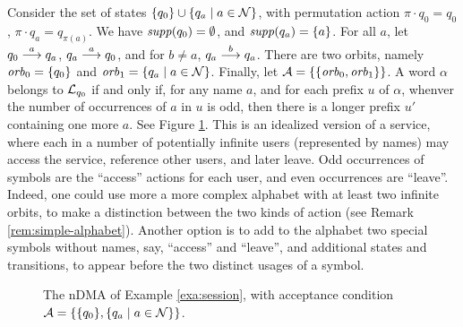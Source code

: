 \begin{example}\label{exa:session}
 Consider the set of states $\{q_0\} \cup \{q_a \mid a \in \mathcal{N}\}$, with permutation action $\pi \cdot q_0 = q_0$, $\pi \cdot q_a = q_{\pi(a)}$. We have $\mathit{supp}(q_0) = \emptyset$, and $\mathit{supp}(q_a) = \{ a \}$. For all $a$, let $q_0 \overset{a}{\longrightarrow} q_a$, $q_a \overset{a}{\longrightarrow} q_0$, and for $b \neq a$, $q_a \overset{b}{\longrightarrow} q_a$. There are two orbits, namely $\mathit{orb}_0 = \{ q_0 \}$ and $\mathit{orb}_1 = \{ q_a \mid a \in \mathcal{N} \} $. Finally, let $\mathcal{A} = \{ \{ \mathit{orb}_0, \mathit{orb}_1 \} \}$. A word $\alpha$ belongs to $\mathcal{L}_{q_0}$ if and only if, for any name $a$, and for each prefix $u$ of $\alpha$, whenver the number of occurrences of $a$ in $u$ is odd, then there is a longer prefix $u'$ containing one more $a$. See Figure \ref{fig:example-session}. This is an idealized version of a service, where each in a number of potentially infinite users (represented by names) may access the service, reference other users, and later leave. Odd occurrences of symbols are the ``access'' actions for each user, and even occurrences are ``leave''. Indeed, one could use more a more complex alphabet with at least two infinite orbits, to make a distinction between the two kinds of action (see Remark \ref{rem:simple-alphabet}). Another option is to add to the alphabet two special symbols without names, say, ``access'' and ``leave'', and additional states and transitions, to appear before the two distinct usages of a symbol.
\end{example}

\begin{figure}
\begin{center}
%
\end{center}
\caption{\label{fig:example-session} The nDMA of Example \ref{exa:session}, with acceptance condition $\mathcal{A} = \{ \{ q_0 \}, \{ q_a \mid a \in \mathcal{N} \}\}$.}
\end{figure}

